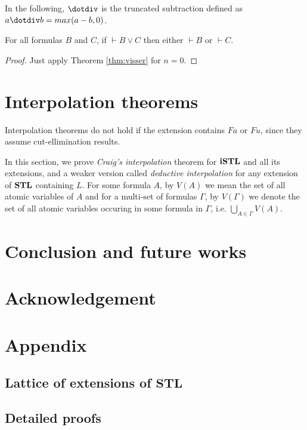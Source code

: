 \documentclass[10pt,a4paper]{amsart}
\begin{document}
\begin{rem}
	In the following, $\dotdiv$ is the truncated subtraction defined as $a \dotdiv b = max(a-b, 0)$.
\end{rem}



\begin{cor}
	For all formulas $B$ and $C$, if $\vdash B \vee C$ then either $\vdash B$ or $\vdash C$.
\end{cor}
\begin{proof}
	Just apply Theorem \ref{thm:visser} for $n = 0$.
\end{proof}

\section{Interpolation theorems}
{\color{red} Interpolation theorems do not hold if the extension contains $Fa$ or $Fu$, since they assume cut-ellimination results.}

In this section, we prove \emph{Craig's interpolation} theorem for $\mathbf{iSTL}$ and all its extensions, and a weaker version called \emph{deductive interpolation} for any extension of $\mathbf{STL}$ containing $L$. For some formula $A$, by $V(A)$ we mean the set of all atomic variables of $A$ and for a multi-set of formulas $\Gamma$, by $V(\Gamma)$ we denote the set of all atomic variables occuring in some formula in $\Gamma$, i.e. $\bigcup_{A \in \Gamma} V(A)$.





\section{Conclusion and future works}

\section{Acknowledgement}

\section{Appendix}
\subsection{Lattice of extensions of $\mathbf{STL}$}


\subsection{Detailed proofs}



\end{document}
